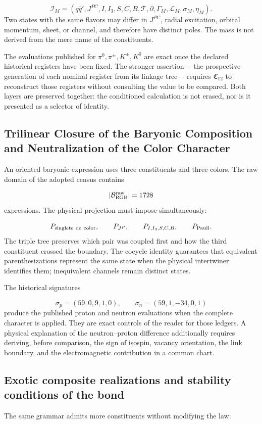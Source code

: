 \[
\mathcal I_M=
(q\bar q',J^{PC},I,I_3,S,C,B,\mathcal T,\partial,
\Gamma_M,\mathcal L_M,\sigma_M,\eta_M).
\]
Two states with the same flavors may differ in \(J^{PC}\), radial excitation, orbital momentum, sheet, or channel, and therefore have distinct poles. The mass is not derived from the mere name of the constituents.

The evaluations published for \(\pi^0,\pi^\pm,K^\pm,K^0\) are exact once the declared historical registers have been fixed. The stronger assertion ---the prospective generation of each nominal register from its linkage tree--- requires \(\mathfrak C_{12}\) to reconstruct those registers without consulting the value to be compared. Both layers are preserved together: the conditioned calculation is not erased, nor is it presented as a selector of identity.

\subsection{Trilinear Closure of the Baryonic Composition and Neutralization of the Color Character}
An oriented baryonic expression uses three constituents and three colors. The raw domain of the adopted census contains

\[
\lvert\mathcal B_{\rm RGB}^{\rm raw}\rvert=1728
\]
expressions. The physical projection must impose simultaneously:

\[
P_{\rm singlete\ de\ color},
\qquad
P_{J^P},
\qquad
P_{I,I_3,S,C,B},
\qquad
P_{\rm Pauli}.
\]
The triple tree preserves which pair was coupled first and how the third constituent crossed the boundary. The cocycle identity guarantees that equivalent parenthesizations represent the same state when the physical intertwiner identifies them; inequivalent channels remain distinct states.

The historical signatures

\[
\sigma_p=(59,0,9,1,0),
\qquad
\sigma_n=(59,1,-34,0,1)
\]
produce the published proton and neutron evaluations when the complete character is applied. They are exact controls of the reader for those ledgers. A physical explanation of the neutron--proton difference additionally requires deriving, before comparison, the sign of isospin, vacancy orientation, the link boundary, and the electromagnetic contribution in a common chart.

\subsection{Exotic composite realizations and stability conditions of the bond}
The same grammar admits more constituents without modifying the law:

